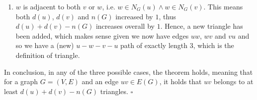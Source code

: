 \begin{enumerate}[a)]
\begin{enumerate}
        \item $w$ is adjacent to both $v$ or $w$, i.e. $w \in N_G(u) \wedge w \in N_G(v)$. This means both $d(u)$, $d(v)$ and $n(G)$ increased by $1$, thus $d(u)+d(v)-n(G)$ increases overall by $1$. Hence, a new triangle has been added, which makes sense given we now have edges $uw$, $wv$ and $vu$ and so we have a (new) $u-w-v-u$ path of exactly length 3, which is the definition of triangle.  
    \end{enumerate}
    In conclusion, in any of the three possible cases, the theorem holds, meaning that for a graph $G = (V,E)$ and an edge $uv \in E(G)$, it holds that $uv$ belongs to at least $d(u)+d(v)-n(G)$ triangles. \hspace{10mm}$\square$
\end{enumerate}
